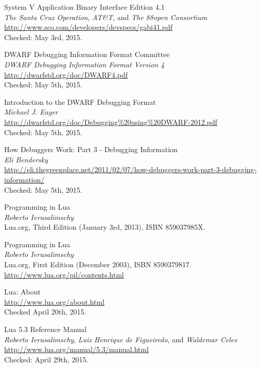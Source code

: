 
\begin{thebibliography}{99}

		System V Application Binary Interface Edition 4.1 \\
		\emph{The Santa Cruz Operation}, \emph{AT\&T}, and \emph{The 88open Consortium} \\
		\url{http://www.sco.com/developers/devspecs/gabi41.pdf} \\
		Checked: May 3rd, 2015.

		DWARF Debugging Information Format Committee \\
		\emph{DWARF Debugging Information Format Version 4} \\
		\url{http://dwarfstd.org/doc/DWARF4.pdf} \\
		Checked: May 5th, 2015.

		Introduction to the DWARF Debugging Format \\
		\emph{Michael J. Eager} \\
		\url{http://dwarfstd.org/doc/Debugging\%20using\%20DWARF-2012.pdf} \\
		Checked: May 5th, 2015.

		How Debuggers Work: Part 3 - Debugging Information \\
		\emph{Eli Bendersky} \\
		\url{http://eli.thegreenplace.net/2011/02/07/how-debuggers-work-part-3-debugging-information/} \\
		Checked: May 5th, 2015.

		Programming in Lua \\
		\emph{Roberto Ierusalimschy} \\
		Lua.org, Third Edition (January 3rd, 2013), ISBN 859037985X.

		Programming in Lua \\
		\emph{Roberto Ierusalimschy} \\
		Lua.org, First Edition (December 2003), ISBN 8590379817. \\
		\url{http://www.lua.org/pil/contents.html}

		Lua: About \\
		\url{http://www.lua.org/about.html} \\
		Checked April 20th, 2015.

		Lua 5.3 Reference Manual \\
		\emph{Roberto Ierusalimschy}, \emph{Luiz Henrique de Figueiredo}, and
		\emph{Waldemar Celes} \\
		\url{http://www.lua.org/manual/5.3/manual.html} \\
		Checked: April 29th, 2015.


\end{thebibliography}
